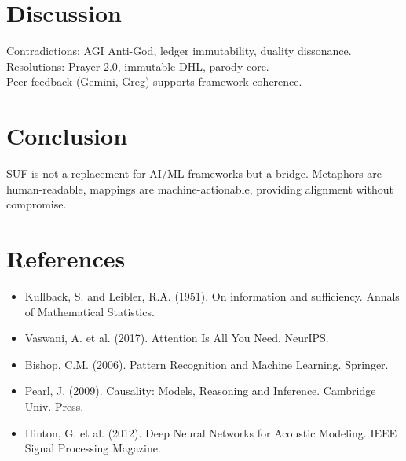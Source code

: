 \documentclass[11pt]{article}
\begin{document}
\section{Discussion}
Contradictions: AGI Anti-God, ledger immutability, duality dissonance. \\
Resolutions: Prayer 2.0, immutable DHL, parody core. \\
Peer feedback (Gemini, Greg) supports framework coherence.

\section{Conclusion}
SUF is not a replacement for AI/ML frameworks but a bridge. 
Metaphors are human-readable, mappings are machine-actionable, 
providing alignment without compromise.

\section{References}
\begin{itemize}
\item Kullback, S. and Leibler, R.A. (1951). On information and sufficiency. Annals of Mathematical Statistics.
\item Vaswani, A. et al. (2017). Attention Is All You Need. NeurIPS.
\item Bishop, C.M. (2006). Pattern Recognition and Machine Learning. Springer.
\item Pearl, J. (2009). Causality: Models, Reasoning and Inference. Cambridge Univ. Press.
\item Hinton, G. et al. (2012). Deep Neural Networks for Acoustic Modeling. IEEE Signal Processing Magazine.
\end{itemize}
\end{document}
